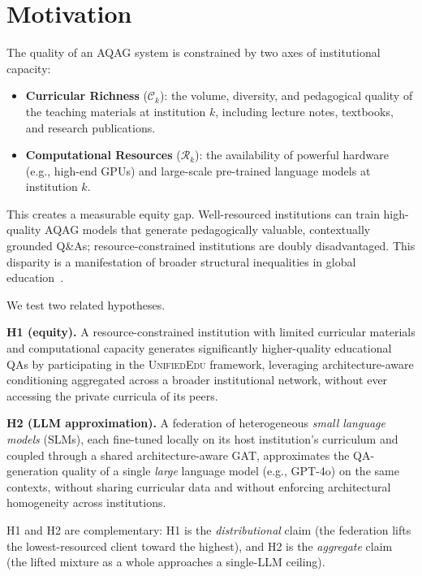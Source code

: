 \documentclass[11pt]{article}
\theoremstyle{plain}
\theoremstyle{definition}
\theoremstyle{remark}
\newcommand{\UniEdu}{\textsc{UnifiedEdu}}
\begin{document}
\section{Motivation}
\label{sec:motivation}

The quality of an AQAG system is constrained by two
axes of institutional capacity:

\begin{itemize}[leftmargin=1.5em, itemsep=2pt]
  \item \textbf{Curricular Richness} ($\mathcal{C}_k$):
  the volume, diversity, and pedagogical quality of
  the teaching materials at institution $k$, including
  lecture notes, textbooks, and research publications.
  \item \textbf{Computational Resources}
  ($\mathcal{R}_k$): the availability of powerful
  hardware (e.g., high-end GPUs) and large-scale
  pre-trained language models at institution $k$.
\end{itemize}

This creates a measurable equity gap. Well-resourced
institutions can train high-quality AQAG models that
generate pedagogically valuable, contextually grounded
Q\&As; resource-constrained institutions are doubly
disadvantaged. This disparity is a manifestation of
broader structural inequalities in global
education~\citep{unterhalter2019measuring,
miao2021artificial}.

\begin{hypothesisbox}
We test two related hypotheses.

\smallskip
\textbf{H1 (equity).} A resource-constrained
institution with limited curricular materials and
computational capacity generates significantly
higher-quality educational QAs by participating in
the \UniEdu{} framework, leveraging
architecture-aware conditioning aggregated across a
broader institutional network, without ever
accessing the private curricula of its peers.

\smallskip
\textbf{H2 (LLM approximation).} A federation of
heterogeneous \emph{small language models} (SLMs),
each fine-tuned locally on its host institution's
curriculum and coupled through a shared
architecture-aware GAT, approximates the
QA-generation quality of a single \emph{large}
language model (e.g., GPT-4o) on the same contexts,
without sharing curricular data and without
enforcing architectural homogeneity across
institutions.

\smallskip
H1 and H2 are complementary: H1 is the
\emph{distributional} claim (the federation lifts
the lowest-resourced client toward the highest), and
H2 is the \emph{aggregate} claim (the lifted mixture
as a whole approaches a single-LLM ceiling).
\end{hypothesisbox}
\end{document}
